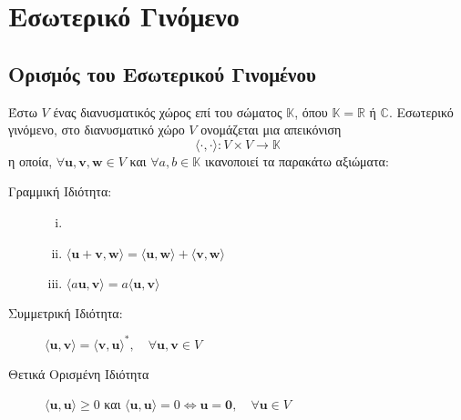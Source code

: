 \documentclass[a4paper,table]{report}
\begin{document}
\chapter{Εσωτερικό Γινόμενο}

\section{Ορισμός του Εσωτερικού Γινομένου}

\begin{dfn}
  Έστω $V$ ένας διανυσματικός χώρος επί του σώματος $\mathbb{K}$, όπου $ \mathbb{K} =
  \mathbb{R} $ ή $ \mathbb{C} $. \textcolor{Col1}{Εσωτερικό γινόμενο}, στο διανυσματικό 
  χώρο $V$ ονομάζεται μια απεικόνιση 
  \[
    \langle \cdot , \cdot \rangle \colon V \times V \to \mathbb{K}
  \] 
  η οποία, $ \forall \mathbf{u}, \mathbf{v}, \mathbf{w} \in V $ και $ \forall a,b \in
  \mathbb{K} $ ικανοποιεί τα παρακάτω αξιώματα:
    \begin{description}
      \item [Γραμμική Ιδιότητα:] 
        \begin{enumerate}[(i)]
          \item []
          \item $ \langle \mathbf{u} + \mathbf{v}, \mathbf{w}\rangle = \langle 
            \mathbf{u}, \mathbf{w}\rangle + \langle \mathbf{v}, \mathbf{w}\rangle $
          \item $ \langle a \mathbf{u}, \mathbf{v}\rangle = a \langle \mathbf{u},
            \mathbf{v}\rangle $
        \end{enumerate}
      \item [Συμμετρική Ιδιότητα:] $ \langle \mathbf{u}, \mathbf{v}\rangle = \langle
        \mathbf{v} , \mathbf{u}\rangle^{*}, 
        \quad \forall \mathbf{u}, \mathbf{v} \in V$
      \item [Θετικά Ορισμένη Ιδιότητα] 
        $ \langle \mathbf{u}, \mathbf{u}\rangle \geq 0 $ και $ \langle \mathbf{u},
        \mathbf{u}\rangle = 0 \Leftrightarrow \mathbf{u} = \mathbf{0},
        \quad \forall \mathbf{u} \in V $
    \end{description}
\end{dfn}
\end{document}
